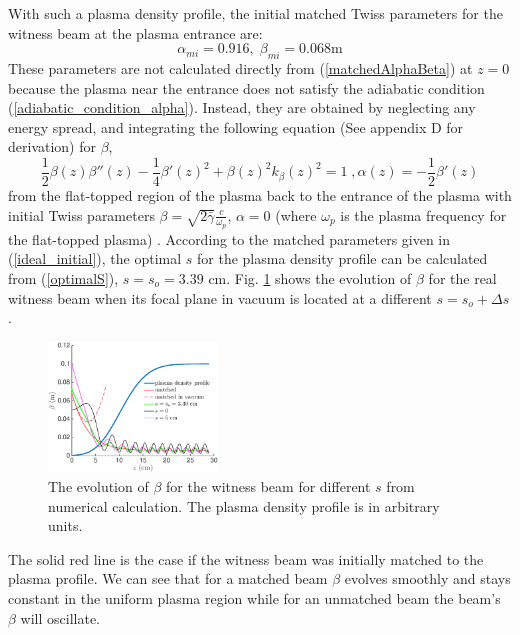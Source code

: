 \documentclass[%
reprint, superscriptaddress,
 amsmath,amssymb, aps,
prstab,
]{revtex4-2}
\begin{document}
With such a plasma density profile,  the initial matched
Twiss parameters for the witness beam at the plasma entrance are:
\begin{equation} \alpha_{mi} = 0.916, \; \beta_{mi} = 0.068 \mbox{m}
\label{ideal_initial} \end{equation} These parameters are not calculated directly from (\ref{matchedAlphaBeta}) at $z=0$
 because the plasma near the entrance does not satisfy the adiabatic condition (\ref{adiabatic_condition_alpha}). Instead, they are
obtained by neglecting any energy spread, and integrating the following equation (See appendix D for derivation) for $\beta$, 
 \begin{equation} \frac{1}{2} \beta(z) \beta''(z) -
\frac{1}{4} \beta'(z)^2 + \beta(z)^2 k_\beta(z)^2 = 1 \;, \alpha(z) =
-\frac{1}{2} \beta'(z) \label{ODE} \end{equation} 
from the flat-topped
region of the plasma back to the entrance of the plasma with initial
Twiss parameters $\beta = \sqrt{2\bar{\gamma}}\frac{c}{\omega_p}$, $
\alpha = 0$ (where $\omega_p$ is the plasma frequency for the
flat-topped plasma) \cite{PWFA_FACETII}. According to the matched
parameters given in (\ref{ideal_initial}), the optimal $s$ for the
plasma density profile can be calculated from (\ref{optimalS}), $s = s_o = 3.39$ cm. Fig.
\ref{fig:beta_evolvement_for_different_s} shows the evolution of $\beta$ for the real witness beam when its focal plane in vacuum is located at
a different $s = s_o + \Delta s$. \begin{figure}[htbp] \centering
\includegraphics[width=0.4\textwidth]{beta_different_cases.eps}
\caption{The evolution of $\beta$ for the witness beam for different $s$ from numerical calculation. The plasma
density profile is in arbitrary units.}
\label{fig:beta_evolvement_for_different_s} \end{figure} The solid red
line is the case if the witness beam was initially matched to the plasma
profile. We can see that for a matched beam $\beta$ evolves smoothly and stays constant
in the uniform plasma region while for an unmatched beam the beam's $\beta$ will oscillate.
\end{document}
